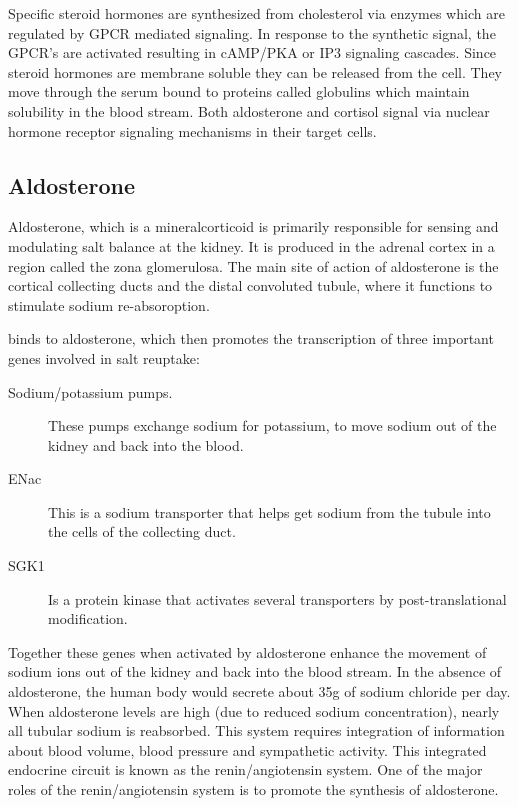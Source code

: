 \documentclass{tufte-handout}
\begin{document}
Specific steroid hormones are synthesized from cholesterol via enzymes which are regulated by GPCR mediated signaling.  In response to the synthetic signal, the GPCR's are activated resulting in cAMP/PKA or IP3 signaling cascades.  Since steroid hormones are membrane soluble they can be released from the cell.  They move through the serum bound to proteins called globulins which maintain solubility in the blood stream.  Both aldosterone and cortisol signal via nuclear hormone receptor signaling mechanisms in their target cells.

\subsection{Aldosterone}

Aldosterone, which is a mineralcorticoid is primarily responsible for sensing and modulating salt balance at the kidney.  It is produced in the adrenal cortex in a region called the zona glomerulosa.  The main site of action of aldosterone is the cortical collecting ducts and the distal convoluted tubule, where it functions to stimulate sodium re-absoroption.  

 binds to aldosterone, which then promotes the transcription of three important genes involved in salt reuptake:

\begin{description}
 \item[Sodium/potassium pumps.]  These pumps exchange sodium for potassium, to move sodium out of the kidney and back into the blood.
 \item[ENac] This is a sodium transporter that helps get sodium from the tubule into the cells of the collecting duct.
 \item[SGK1] Is a protein kinase that activates several transporters by post-translational modification.
\end{description}

Together these genes when activated by aldosterone enhance the movement of sodium ions out of the kidney and back into the blood stream.  In the absence of aldosterone, the human body would secrete about 35g of sodium chloride per day.  When aldosterone levels are high (due to reduced sodium concentration), nearly all tubular sodium is reabsorbed.  This  system requires integration of information about blood volume, blood pressure and sympathetic activity.  This integrated endocrine circuit is known as the renin/angiotensin system.  One of the major roles of the renin/angiotensin system is to promote the synthesis of aldosterone.
\end{document}
